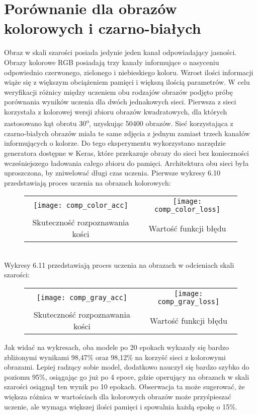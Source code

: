 \section{Porównanie dla obrazów kolorowych i czarno-białych}
Obraz w skali szarości posiada jedynie jeden kanał odpowiadający jasności. Obrazy kolorowe RGB
posiadają trzy kanały informujące o nasyceniu odpowiednio czerwonego, zielonego i niebieskiego koloru.
Wzrost ilości informacji wiąże się z większym obciążeniem pamięci i większą ilością parametrów.
W celu weryfikacji różnicy między uczeniem obu rodzajów obrazów podjęto próbę porównania wyników
uczenia dla dwóch jednakowych sieci. Pierwsza z sieci korzystała z kolorowej wersji zbioru
obrazów kwadratowych, dla których zastosowano kąt obrotu 30\textsuperscript{o}, uzyskując
50400 obrazów. Sieć korzystająca z czarno-białych obrazów miała te same zdjęcia z jednym
zamiast trzech kanałów informujących o kolorze. Do tego eksperymentu
wykorzystano narzędzie generatora dostępne w Keras, które przekazuje obrazy do sieci
bez konieczności wcześniejszego ładowania całego zbioru do pamięci. Architektura obu
sieci była uproszczona, by zniwelować długi czas uczenia. Pierwsze wykresy 6.10 przedstawiają
proces uczenia na obrazach kolorowych:\\
\begin{figure}[h!]
\begin{center}
\begin{tabular}{cc}
\texttt{[image: comp\_color\_acc]} &
\texttt{[image: comp\_color\_loss]} \\
 Skuteczność rozpoznawania kości & Wartość funkcji błędu\\
\end{tabular}
\label{fig:comp_color}
\end{center}
\end{figure} \\
Wykresy 6.11 przedstawiają proces uczenia na obrazach w odcieniach skali szarości:\\
\begin{figure}[h!]
\begin{center}
\begin{tabular}{cc}
\texttt{[image: comp\_gray\_acc]} &
\texttt{[image: comp\_gray\_loss]} \\
 Skuteczność rozpoznawania kości & Wartość funkcji błędu\\
\end{tabular}
\label{fig:comp_gray}
\end{center}
\end{figure}\newpage
Jak widać na wykresach, oba modele po 20 epokach wykazały się bardzo zbliżonymi wynikami 98,47\% oraz 98,12\%
na korzyść sieci z kolorowymi obrazami. Lepiej radzący sobie model, dodatkowo nauczył
się bardzo szybko do poziomu 95\%, osiągając go już po 4 epoce, gdzie operujący na
obrazach w skali szarości osiągnął ten wynik po 10 epokach. Obserwacja ta może sugerować,
że większa różnica w wartościach dla kolorowych obrazów może przyśpieszać uczenie, ale
wymaga większej ilości pamięci i spowalnia każdą epokę o 15\%.

